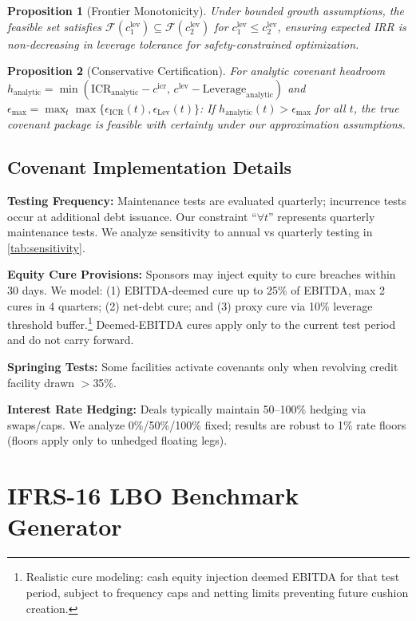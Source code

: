 \documentclass[11pt,a4paper]{article}
\numberwithin{equation}{section}
\theoremstyle{plain}
\newtheorem{proposition}{Proposition}
\theoremstyle{definition}
\begin{document}
\begin{proposition}[Frontier Monotonicity]\label{prop:frontier}
Under bounded growth assumptions, the feasible set satisfies $\mathcal{F}(c^{\text{lev}}_1)\subseteq \mathcal{F}(c^{\text{lev}}_2)$ for $c^{\text{lev}}_1\le c^{\text{lev}}_2$, ensuring expected IRR is non-decreasing in leverage tolerance for safety-constrained optimization.
\end{proposition}

\begin{proposition}[Conservative Certification]\label{prop:certification}
For analytic covenant headroom $h_{\text{analytic}}=\min(\text{ICR}_{\text{analytic}}-c^{\text{icr}},\, c^{\text{lev}}-\text{Leverage}_{\text{analytic}})$ and $\epsilon_{\max}=\max_t \max\{\epsilon_{\text{ICR}}(t),\epsilon_{\text{Lev}}(t)\}$:
If $h_{\text{analytic}}(t)>\epsilon_{\max}$ for all $t$, the true covenant package is feasible with certainty under our approximation assumptions.
\end{proposition}

\subsection{Covenant Implementation Details}

\textbf{Testing Frequency:} Maintenance tests are evaluated quarterly; incurrence tests occur at additional debt issuance. Our constraint ``$\forall t$'' represents quarterly maintenance tests. We analyze sensitivity to annual vs quarterly testing in \cref{tab:sensitivity}.

\textbf{Equity Cure Provisions:} Sponsors may inject equity to cure breaches within 30 days. We model: (1) EBITDA-deemed cure up to 25\% of EBITDA, max 2 cures in 4 quarters; (2) net-debt cure; and (3) proxy cure via 10\% leverage threshold buffer.\footnote{Realistic cure modeling: cash equity injection deemed EBITDA for that test period, subject to frequency caps and netting limits preventing future cushion creation.} Deemed-EBITDA cures apply only to the current test period and do not carry forward.

\textbf{Springing Tests:} Some facilities activate covenants only when revolving credit facility drawn $>$35\%.

\textbf{Interest Rate Hedging:} Deals typically maintain 50--100\% hedging via swaps/caps. We analyze 0\%/50\%/100\% fixed; results are robust to 1\% rate floors (floors apply only to unhedged floating legs).

\section{IFRS-16 LBO Benchmark Generator}
\end{document}
